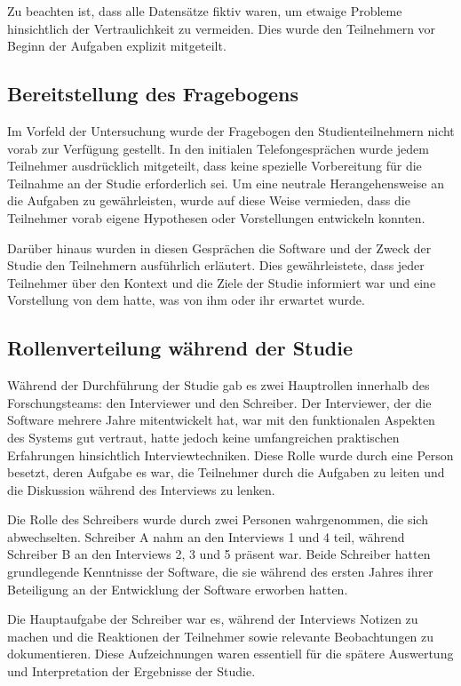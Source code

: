 Zu beachten ist, dass alle Datensätze fiktiv waren, um etwaige Probleme hinsichtlich der Vertraulichkeit zu vermeiden. Dies wurde den Teilnehmern vor Beginn der Aufgaben explizit mitgeteilt.

\subsection{Bereitstellung des Fragebogens}

Im Vorfeld der Untersuchung wurde der Fragebogen den Studienteilnehmern nicht vorab zur Verfügung gestellt. In den initialen Telefongesprächen wurde jedem Teilnehmer ausdrücklich mitgeteilt, dass keine spezielle Vorbereitung für die Teilnahme an der Studie erforderlich sei. Um eine neutrale Herangehensweise an die Aufgaben zu gewährleisten, wurde auf diese Weise vermieden, dass die Teilnehmer vorab eigene Hypothesen oder Vorstellungen entwickeln konnten.

Darüber hinaus wurden in diesen Gesprächen die Software und der Zweck der Studie den Teilnehmern ausführlich erläutert. Dies gewährleistete, dass jeder Teilnehmer über den Kontext und die Ziele der Studie informiert war und eine Vorstellung von dem hatte, was von ihm oder ihr erwartet wurde.

\subsection{Rollenverteilung während der Studie}

Während der Durchführung der Studie gab es zwei Hauptrollen innerhalb des Forschungsteams: den Interviewer und den Schreiber. Der Interviewer, der die Software mehrere Jahre mitentwickelt hat, war mit den funktionalen Aspekten des Systems gut vertraut, hatte jedoch keine umfangreichen praktischen Erfahrungen hinsichtlich Interviewtechniken. Diese Rolle wurde durch eine Person besetzt, deren Aufgabe es war, die Teilnehmer durch die Aufgaben zu leiten und die Diskussion während des Interviews zu lenken.

Die Rolle des Schreibers wurde durch zwei Personen wahrgenommen, die sich abwechselten. Schreiber A nahm an den Interviews 1 und 4 teil, während Schreiber B an den Interviews 2, 3 und 5 präsent war. Beide Schreiber hatten grundlegende Kenntnisse der Software, die sie während des ersten Jahres ihrer Beteiligung an der Entwicklung der Software erworben hatten.

Die Hauptaufgabe der Schreiber war es, während der Interviews Notizen zu machen und die Reaktionen der Teilnehmer sowie relevante Beobachtungen zu dokumentieren. Diese Aufzeichnungen waren essentiell für die spätere Auswertung und Interpretation der Ergebnisse der Studie.

